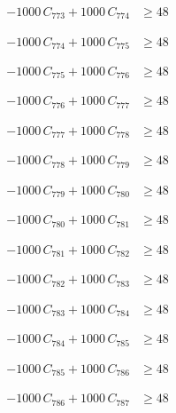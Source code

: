 \documentclass[a4paper,11pt]{article}
\begin{document}
\begin{align}
-1000\,C_{773} + 1000\,C_{774} &\geq 48 \nonumber
\end{align}

\begin{align}
-1000\,C_{774} + 1000\,C_{775} &\geq 48 \nonumber
\end{align}

\begin{align}
-1000\,C_{775} + 1000\,C_{776} &\geq 48 \nonumber
\end{align}

\begin{align}
-1000\,C_{776} + 1000\,C_{777} &\geq 48 \nonumber
\end{align}

\begin{align}
-1000\,C_{777} + 1000\,C_{778} &\geq 48 \nonumber
\end{align}

\begin{align}
-1000\,C_{778} + 1000\,C_{779} &\geq 48 \nonumber
\end{align}

\begin{align}
-1000\,C_{779} + 1000\,C_{780} &\geq 48 \nonumber
\end{align}

\begin{align}
-1000\,C_{780} + 1000\,C_{781} &\geq 48 \nonumber
\end{align}

\begin{align}
-1000\,C_{781} + 1000\,C_{782} &\geq 48 \nonumber
\end{align}

\begin{align}
-1000\,C_{782} + 1000\,C_{783} &\geq 48 \nonumber
\end{align}

\begin{align}
-1000\,C_{783} + 1000\,C_{784} &\geq 48 \nonumber
\end{align}

\begin{align}
-1000\,C_{784} + 1000\,C_{785} &\geq 48 \nonumber
\end{align}

\begin{align}
-1000\,C_{785} + 1000\,C_{786} &\geq 48 \nonumber
\end{align}

\begin{align}
-1000\,C_{786} + 1000\,C_{787} &\geq 48 \nonumber
\end{align}
\end{document}
